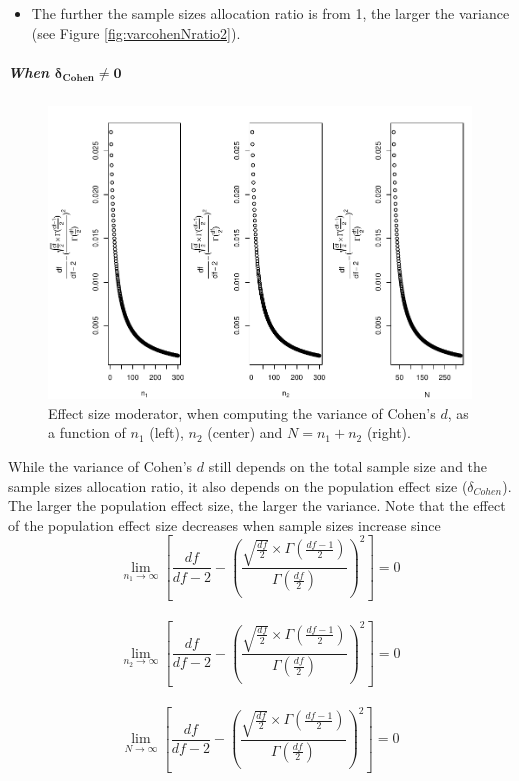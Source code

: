 \documentclass[
  english,
  man,mask]{apa6}
\providecommand{\tightlist}{%
  \setlength{\itemsep}{0pt}\setlength{\parskip}{0pt}}
\let\oldsubparagraph\subparagraph
\renewcommand{\subparagraph}[1]{\oldsubparagraph{#1}\mbox{}}
\begin{document}
\begin{itemize}
\tightlist
\item
  The further the sample sizes allocation ratio is from 1, the larger the variance (see Figure \ref{fig:varcohenNratio2}).
\end{itemize}

\hypertarget{when-bmdelta_cohenneq-0}{%
\subparagraph{\texorpdfstring{When \(\bm{\delta_{Cohen}\neq 0}\)}{When \textbackslash bm\{\textbackslash delta\_\{Cohen\}\textbackslash neq 0\}}}\label{when-bmdelta_cohenneq-0}}

\begin{figure}
\centering
\includegraphics{Theoretical-Bias-of-all-estimators-as-a-function-of-population-parameters_files/figure-latex/ESmoderatorcohenNsize2-1.pdf}
\caption{\label{fig:ESmoderatorcohenNsize2}Effect size moderator, when computing the variance of Cohen's \(d\), as a function of \(n_1\) (left), \(n_2\) (center) and \(N=n_1+n_2\) (right).}
\end{figure}

While the variance of Cohen's \(d\) still depends on the total sample size and the sample sizes allocation ratio, it also depends on the population effect size (\(\delta_{Cohen}\)). The larger the population effect size, the larger the variance. Note that the effect of the population effect size decreases when sample sizes increase since
\[\lim_{n_1\rightarrow \infty}\left[\frac{df}{df-2} - \left( \frac{\sqrt{\frac{df}{2}} \times \Gamma \left(\frac{df-1}{2} \right)}{\Gamma \left( \frac{df}{2}\right)}\right)^2 \right]=0\]\\
\[\lim_{n_2\rightarrow \infty}\left[\frac{df}{df-2} - \left( \frac{\sqrt{\frac{df}{2}} \times \Gamma \left(\frac{df-1}{2} \right)}{\Gamma \left( \frac{df}{2}\right)}\right)^2 \right]=0\]\\
\[\lim_{N\rightarrow \infty}\left[\frac{df}{df-2} - \left( \frac{\sqrt{\frac{df}{2}} \times \Gamma \left(\frac{df-1}{2} \right)}{\Gamma \left( \frac{df}{2}\right)}\right)^2 \right]=0\]
\end{document}
